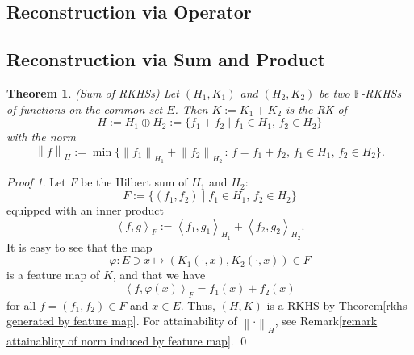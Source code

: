 \documentclass[a4paper,12pt]{article}
\newtheorem{thm}{Theorem}[section]
\theoremstyle{remark}
\newtheorem*{prf}{Proof}
\theoremstyle{definition}
\theoremstyle{definition}
\theoremstyle{definition}
\newcommand{\ip}[2]{\left<#1, #2 \right>}
\newcommand{\norm}[1]{\left\| #1 \right\|}
\begin{document}
\subsection{Reconstruction via Operator}
\subsection{Reconstruction via Sum and Product}

\begin{thm} (Sum of RKHSs)
	Let \( (H_1,K_1) \) and \( (H_2,K_2) \) be two \( \mathbb{F} \)-RKHSs of functions on the common set \( E \).
	Then \( K:= K_1 + K_2 \) is the RK of
	\begin{equation*}
		H:= H_1 \oplus H_2:= \{f_1 + f_2 \mid f_1 \in H_1, \, f_2 \in H_2\}
	\end{equation*}
	with the norm
	\begin{equation*}
		\norm{f}_H := \min \{\norm{f_1}_{H_1}+\norm{f_2}_{H_2} \,:\, f = f_1 + f_2,\,f_1 \in H_1,\,f_2 \in H_2\}.
	\end{equation*}
\end{thm}
\begin{prf}
	Let \( F \) be the Hilbert sum of \( H_1 \) and \( H_2 \):
	\begin{equation*}
		F := \{(f_1, f_2)\mid f_1 \in H_1,\, f_2 \in H_2\}
	\end{equation*}
	equipped with an inner product
	\begin{equation*}
		\ip{f}{g}_F := \ip{f_1}{g_1}_{H_1} + \ip{f_2}{g_2}_{H_2}.
	\end{equation*}
	It is easy to see that the map
	\begin{equation*}
		\varphi : E \ni x \mapsto \left( K_1(\cdot ,x), K_2(\cdot ,x) \right) \in F
	\end{equation*}
	is a feature map of \( K \), and that we have
	\begin{equation*}
		\ip{f}{\varphi(x)}_F = f_1(x)+f_2(x)
	\end{equation*}
	for all \( f = (f_1,f_2) \in F \) and \( x \in E \).
	Thus, \( (H,K) \) is a RKHS by Theorem\ref{rkhs generated by feature map}. For attainability of \( \norm{\cdot}_H \), see Remark\ref{remark attainablity of norm induced by feature map}.
	\qed\end{prf}
\end{document}
